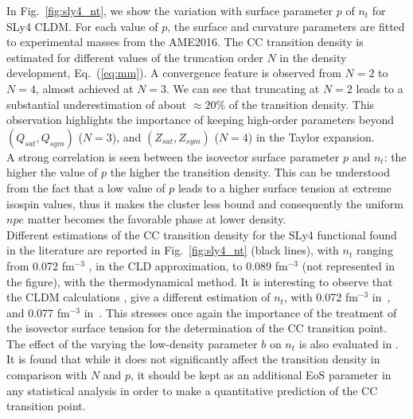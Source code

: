 In Fig.~\ref{fig:sly4_nt}, we show the variation with surface parameter $p$ of 
$n_t$ for SLy4 CLDM. For each value of $p$, the surface and curvature 
parameters are fitted to experimental masses from the AME2016. 
The CC transition density is estimated for different 
values of the truncation order $N$ in the density development, 
Eq.~(\ref{eq:mm}). A convergence feature is observed from $N=2$ to $N=4$,
almost achieved at $N=3$. We can see that truncating at $N=2$ leads to a 
substantial underestimation of about $\approx 20\%$ of the transition density. 
This observation highlights the importance of keeping high-order 
parameters beyond $(Q_{sat},Q_{sym})$ ($N=3$), and $(Z_{sat},Z_{sym})$ ($N=4$)
in the Taylor expansion.\\
A strong correlation is seen between the isovector surface parameter $p$ and $n_t$: the
higher the value of $p$ the higher the transition density. This can be
understood from the fact that a low value of $p$ leads to a higher surface 
tension at extreme isospin values, thus it makes the cluster less bound and
consequently the uniform ${npe}$ matter becomes the favorable phase at lower
density.\\
Different estimations of the CC transition density for the SLy4 functional
found in the literature are reported in Fig.~\ref{fig:sly4_nt} (black lines), 
with $n_t$ ranging from 0.072 fm$^{-3}$ \cite{Vinas2017}, in the 
CLD approximation, to 0.089 fm$^{-3}$ \cite{Ducoin2011} (not represented in the 
figure), with the thermodynamical method. It is interesting to observe that 
the  CLDM calculations , give a different estimation of 
$n_t$, with 0.072 fm$^{-3}$ in~\cite{Vinas2017}, and 0.077 fm$^{-3}$ 
in~\cite{Douchin2000a}. This stresses once again the importance of the 
treatment of the isovector surface tension for the determination of the CC 
transition point.\\
The effect of the varying the low-density parameter $b$ on $n_t$ is also 
evaluated in \cite{Carreau2019cc}. It is found that while it does not 
significantly affect the transition density in comparison with $N$ and $p$, it 
should be kept as an additional EoS parameter in any statistical analysis in
order to make a quantitative prediction of the CC transition point.

